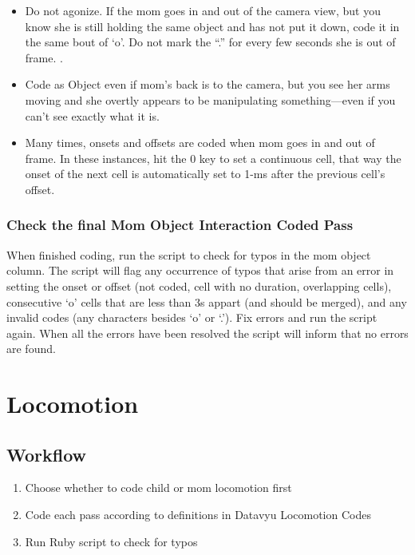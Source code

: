 \documentclass[
  12pt,
]{book}
\providecommand{\tightlist}{%
  \setlength{\itemsep}{0pt}\setlength{\parskip}{0pt}}
\begin{document}
\begin{itemize}
\item
  Do not agonize. If the mom goes in and out of the camera view, but you know she is still holding the same object and has not put it down, code it in the same bout of `o'. Do not mark the ``.'' for every few seconds she is out of frame. .
\item
  Code as Object even if mom's back is to the camera, but you see her arms moving and she overtly appears to be manipulating something---even if you can't see exactly what it is.
\item
  Many times, onsets and offsets are coded when mom goes in and out of frame. In these instances, hit the 0 key to set a continuous cell, that way the onset of the next cell is automatically set to 1-ms after the previous cell's offset.
\end{itemize}

\hypertarget{check-the-final-mom-object-interaction-coded-pass}{%
\subsection*{Check the final Mom Object Interaction Coded Pass}\label{check-the-final-mom-object-interaction-coded-pass}}

When finished coding, run the script to check for typos in the mom object column. The script will flag any occurrence of typos that arise from an error in setting the onset or offset (not coded, cell with no duration, overlapping cells), consecutive `o' cells that are less than 3s appart (and should be merged), and any invalid codes (any characters besides `o' or `.'). Fix errors and run the script again. When all the errors have been resolved the script will inform that no errors are found.

\hypertarget{locomotion}{%
\chapter{Locomotion}\label{locomotion}}

\hypertarget{workflow-4}{%
\section{Workflow}\label{workflow-4}}

\begin{enumerate}
\def\labelenumi{\arabic{enumi}.}
\tightlist
\item
  Choose whether to code child or mom locomotion first
\item
  Code each pass according to definitions in Datavyu Locomotion Codes
\item
  Run Ruby script to check for typos
\end{enumerate}
\end{document}
